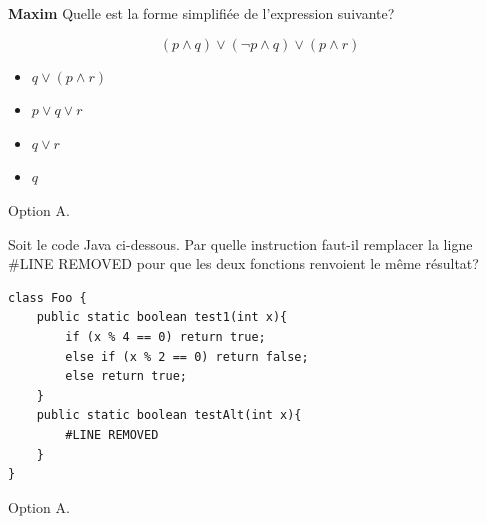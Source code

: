 

\begin{Exercice}[5 minutes]\textbf{Maxim}
Quelle est la forme simplifiée de l’expression suivante?

$$ (p \land q) \lor (\lnot p \land q) \lor (p \land r) $$

\begin{itemize}
    \item $q \lor (p \land r)$
    \item $p \lor q \lor r$
    \item $q \lor r$
    \item $q$
\end{itemize}

\begin{solution}
Option A. 
\end{solution}
\vspace*{0.3cm}
Soit le code Java ci-dessous. Par quelle instruction faut-il remplacer la ligne \#LINE REMOVED pour que les deux fonctions renvoient le même résultat?
\begin{lstlisting}[style=javastyle]
class Foo { 
    public static boolean test1(int x){ 
        if (x % 4 == 0) return true; 
        else if (x % 2 == 0) return false; 
        else return true;
    } 
    public static boolean testAlt(int x){ 
        #LINE REMOVED 
    } 
}
\end{lstlisting}


\begin{solution}
Option A. 
\end{solution}


\end{Exercice}




